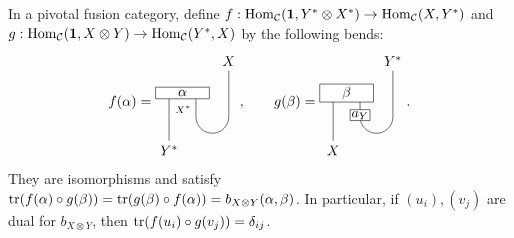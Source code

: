 \documentclass{amsart}
\begin{document}
\begin{lemma}\label{lem:mouv}\label{lem:basis}
In a pivotal fusion category, define
$f:\mathrm{Hom}_{\mathcal{C}}({\bf 1},Y^*\otimes X^*)\to\mathrm{Hom}_{\mathcal{C}}(X,Y^*)$ and
$g:\mathrm{Hom}_{\mathcal{C}}({\bf 1},X\otimes Y)\to\mathrm{Hom}_{\mathcal{C}}(Y^*,X)$ by the following bends:
\[
f(\alpha)=
\begin{tikzpicture}[baseline=(current bounding box.center),scale=.75]
\draw (-.45,.45)--(-.45,-1.15) node[below] {$Y^*$};
\draw (.45,.45)--(.45,-.35) arc(180:360:.55)--(1.55,1.2) node[above] {$X$};
\node[draw,fill=white,minimum width=1.35cm,inner sep=2pt] at (0,.45) {$\alpha$};
\node[left,font=\scriptsize] at (.45,-.1) {$X^*$};
\end{tikzpicture},\qquad
g(\beta)=
\begin{tikzpicture}[baseline=(current bounding box.center),scale=.75]
\draw (-.45,.45)--(-.45,-1.15) node[below] {$X$};
\draw (.45,.45)--(.45,-.35) arc(180:360:.55)--(1.55,1.2) node[above] {$Y^*$};
\node[draw,fill=white,minimum width=1.35cm,inner sep=2pt] at (0,.45) {$\beta$};
\node[draw,fill=white,inner sep=1pt] at (.45,-.29) {$a_Y$};

\end{tikzpicture}.
\]
They are isomorphisms and satisfy
$\mathrm{tr}(f(\alpha)\circ g(\beta))=\mathrm{tr}(g(\beta)\circ f(\alpha))=b_{X\otimes Y}(\alpha,\beta)$.
In particular, if $(u_i),(v_j)$ are dual for $b_{X\otimes Y}$, then
$\mathrm{tr}(f(u_i)\circ g(v_j))=\delta_{ij}$.
\end{lemma}
\end{document}

